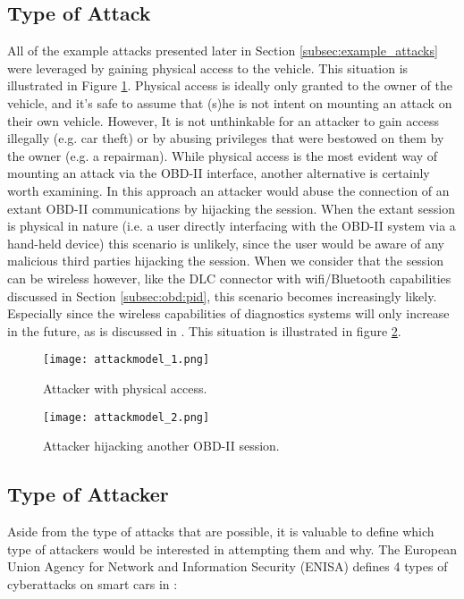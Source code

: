 \subsection{Type of Attack}  
All of the example attacks presented later in Section \ref{subsec:example_attacks} were leveraged by gaining physical access to the vehicle. This situation is illustrated in Figure \ref{fig:attackmodel_1}. Physical access is ideally only granted to the owner of the vehicle, and it's safe to assume that (s)he is not intent on mounting an attack on their own vehicle. However, It is not unthinkable for an attacker to gain access illegally (e.g. car theft) or by abusing privileges that were bestowed on them by the owner (e.g. a repairman). While physical access is the most evident way of mounting an attack via the OBD-II interface, another alternative is certainly worth examining. In this approach an attacker would abuse the connection of an extant OBD-II communications by hijacking the session. When the extant session is physical in nature (i.e. a user directly interfacing with the OBD-II system via a hand-held device) this scenario is unlikely, since the user would be aware of any malicious third parties hijacking the session. When we consider that the session can be wireless however, like the DLC connector with wifi/Bluetooth capabilities discussed in Section \ref{subsec:obd:pid}, this scenario becomes increasingly likely. Especially since the wireless capabilities of diagnostics systems will only increase in the future, as is discussed in \cite{Kleberger}. This situation is illustrated in figure \ref{fig:attackmodel_2}.


\begin{figure}[h]
	\label{fig:attackmodel_1}
	\centering
	\texttt{[image: attackmodel\_1.png]}
	\caption{Attacker with physical access.}
\end{figure}

\begin{figure}[h]
	\label{fig:attackmodel_2}
	\centering
	\texttt{[image: attackmodel\_2.png]}
	\caption{Attacker hijacking another OBD-II session.}
\end{figure}

\subsection{Type of Attacker}
Aside from the type of attacks that are possible, it is valuable to define which type of attackers would be interested in attempting them and why. The European Union Agency for Network and Information Security (ENISA) defines 4 types of cyberattacks on smart cars in \cite{Enisa}: 


